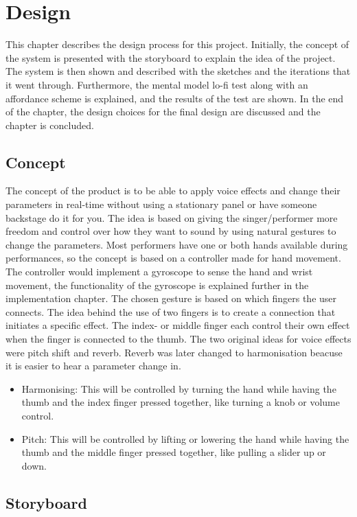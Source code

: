 \chapter{Design}
This chapter describes the design process for this project. Initially, the concept of the system is presented with the storyboard to explain the idea of the project. The system is then shown and described with the sketches and the iterations that it went through. Furthermore, the mental model lo-fi test along with an affordance scheme is explained, and the results of the test are shown. In the end of the chapter, the design choices for the final design are discussed and the chapter is concluded.

\section{Concept}
The concept of the product is to be able to apply voice effects and change their parameters in real-time without using a stationary panel or have someone backstage do it for you. The idea is based on giving the singer/performer more freedom and control over how they want to sound by using natural gestures to change the parameters. Most performers have one or both hands available during performances, so the concept is based on a controller made for hand movement. 
The controller would implement a gyroscope to sense the hand and wrist movement, the functionality of the gyroscope is explained further in the implementation chapter. 
The chosen gesture is based on which fingers the user connects. The idea behind the use of two fingers is to create a connection that initiates a specific effect. 
The index- or middle finger each control their own effect when the finger is connected to the thumb.
The two original ideas for voice effects were pitch shift and reverb. Reverb was later changed to harmonisation beacuse it is easier to hear a parameter change in. 


\begin{itemize}
\item Harmonising: This will be controlled by turning the hand while having the thumb and the index finger pressed together, like turning a knob or volume control.
\item Pitch: This will be controlled by lifting or lowering the hand while having the thumb and the middle finger pressed together, like pulling a slider up or down.
\end{itemize}

\section{Storyboard}

